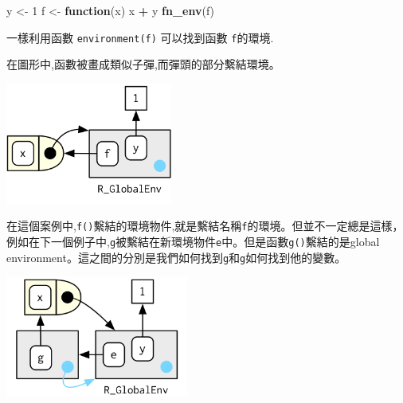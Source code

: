 \documentclass[]{book}
\newenvironment{Shaded}{\begin{snugshade}}{\end{snugshade}}
\newcommand{\ControlFlowTok}[1]{\textcolor[rgb]{0.13,0.29,0.53}{\textbf{#1}}}
\newcommand{\DecValTok}[1]{\textcolor[rgb]{0.00,0.00,0.81}{#1}}
\newcommand{\KeywordTok}[1]{\textcolor[rgb]{0.13,0.29,0.53}{\textbf{#1}}}
\newcommand{\NormalTok}[1]{#1}
\newcommand{\OperatorTok}[1]{\textcolor[rgb]{0.81,0.36,0.00}{\textbf{#1}}}
\newcommand{\StringTok}[1]{\textcolor[rgb]{0.31,0.60,0.02}{#1}}
\theoremstyle{definition}
\theoremstyle{definition}
\theoremstyle{definition}
\theoremstyle{remark}
\begin{document}
\begin{Shaded}
\begin{Highlighting}[]
\NormalTok{y <-}\StringTok{ }\DecValTok{1}
\NormalTok{f <-}\StringTok{ }\ControlFlowTok{function}\NormalTok{(x) x }\OperatorTok{+}\StringTok{ }\NormalTok{y}
\KeywordTok{fn_env}\NormalTok{(f)}
\end{Highlighting}
\end{Shaded}

一樣利用函數 \texttt{environment(f)} 可以找到函數 \texttt{f}的環境.

在圖形中,函數被畫成類似子彈,而彈頭的部分繫結環境。

\begin{center}\includegraphics[width=2.16in]{diagrams/environments/binding} \end{center}

在這個案例中,\texttt{f()}繫結的環境物件,就是繫結名稱\texttt{f}的環境。但並不一定總是這樣，例如在下一個例子中,\texttt{g}被繫結在新環境物件\texttt{e}中。但是函數\texttt{g()}繫結的是global
environment。這之間的分別是我們如何找到\texttt{g}和\texttt{g}如何找到他的變數。

\begin{Shaded}
\end{Shaded}

\begin{center}\includegraphics[width=2.36in]{diagrams/environments/binding-2} \end{center}
\end{document}
